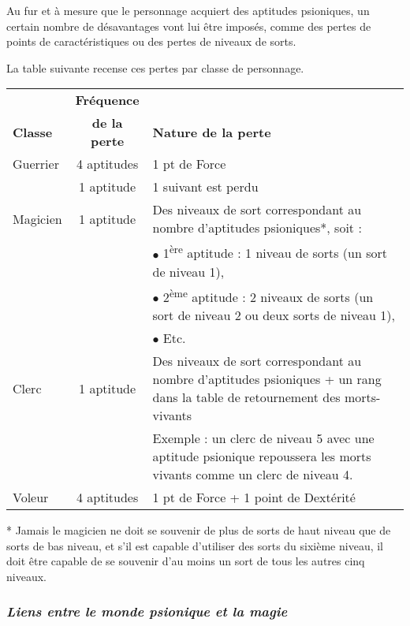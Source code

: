 Au fur et à mesure que le personnage acquiert des aptitudes psioniques, un certain nombre de désavantages vont lui être imposés, comme des pertes de points de caractéristiques ou des pertes de niveaux de sorts.

\bigskip

La table suivante recense ces pertes par classe de personnage.

\bigskip

\begin{tabular}{lcp{12cm}}
& \textbf{Fréquence} & \\
\textbf{Classe} & \textbf{de la perte} & \textbf{Nature de la perte}\\
Guerrier & 4 aptitudes & 1 pt de Force \\
& 1 aptitude & 1 suivant est perdu \\
Magicien & 1 aptitude & Des niveaux de sort correspondant au nombre d'aptitudes psioniques*, soit : \\
&& $\bullet$ 1\textsuperscript{ère} aptitude : 1 niveau de sorts (un sort de niveau 1), \\
&& $\bullet$ 2\textsuperscript{ème} aptitude : 2 niveaux de sorts (un sort de niveau 2 ou deux sorts de niveau 1), \\
&& $\bullet$ Etc. \\
Clerc & 1 aptitude & Des niveaux de sort correspondant au nombre d'aptitudes psioniques + un rang dans la table de retournement des morts-vivants \\
&& Exemple : un clerc de niveau 5 avec une aptitude psionique repoussera les morts vivants comme un clerc de niveau 4. \\
Voleur & 4 aptitudes & 1 pt de Force + 1 point de Dextérité \\
\end{tabular}

\bigskip

* Jamais le magicien ne doit se souvenir de plus de sorts de haut niveau que de sorts de bas niveau, et s'il est capable d'utiliser des sorts du sixième niveau, il doit être capable de se souvenir d'au moins un sort de tous les autres cinq niveaux.

\subsubsection*{\textit{Liens entre le monde psionique et la magie}}
\label{custom-liens-aptitudes-sorts}

